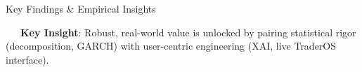 \documentclass{beamer}
\begin{document}
\begin{frame}{Key Findings \& Empirical Insights}
\vspace{0.15cm}
\begin{tcolorbox}[enhanced, colback=primaryblue!4, colframe=primaryblue!30, boxrule=0.35pt,
  arc=3.5pt, width=0.98\textwidth, left=4pt, right=4pt, top=2.5pt, bottom=2.5pt, boxsep=0pt,
  halign=center, shadow={0.5pt}{-0.5pt}{0pt}{black!8}]
    \fontsize{5.5pt}{6.5pt}\selectfont
    \textcolor{primaryDark}{~~~\textbf{Key Insight}: Robust, real-world value is unlocked by pairing statistical rigor (decomposition, GARCH) with user-centric engineering (XAI, live TraderOS interface).}
\end{tcolorbox}
\end{frame}

\end{document}
